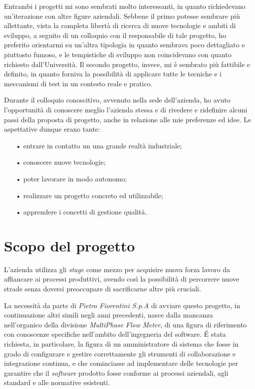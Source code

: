 Entrambi i progetti mi sono sembrati molto interessanti, in quanto richiedevano un'iterazione con altre figure aziendali. Sebbene il primo potesse sembrare più allettante, vista la completa libertà di ricerca di nuove tecnologie e ambiti di sviluppo, a seguito di un colloquio con il responsabile di tale progetto, ho preferito orientarmi su un'altra tipologia in quanto sembrava poco dettagliato e piuttosto fumoso, e le tempistiche di sviluppo non coincidevano con quanto richiesto dall'Università. Il secondo progetto, invece, mi è sembrato più fattibile e definito, in quanto forniva la possibilità di applicare tutte le tecniche e i meccanismi di test in un contesto reale e pratico.

Durante il colloquio conoscitivo, avvenuto nella sede dell'azienda, ho avuto l'opportunità di conoscere meglio l'azienda stessa e di rivedere e ridefinire alcuni passi della proposta di progetto, anche in relazione alle mie preferenze ed idee. Le aspettative dunque erano tante:
\begin{itemize}
\item[•] entrare in contatto un una grande realtà industriale;
\item[•] conoscere nuove tecnologie;
\item[•] poter lavorare in modo autonomo;
\item[•] realizzare un progetto concreto ed utilizzabile;
\item[•] apprendere i concetti di gestione qualità.
\end{itemize}


\section{Scopo del progetto}

L'azienda utilizza gli \textit{stage} come mezzo per acquisire nuova forza lavoro da affiancare ai processi produttivi, avendo così la possibilità di percorrere nuove strade senza doversi preoccupare di sacrificarne altre più cruciali. 

La necessità da parte di \textit{Pietro Fiorentini S.p.A} di avviare questo progetto, in continuazione altri simili negli anni precedenti, nasce dalla mancanza nell'organico della divisione \textit{MultiPhase Flow Meter}, di una figura di riferimento con conoscenze specifiche nell'ambito dell'ingegneria del software. É stata richiesta, in particolare, la figura di un amministratore di sistema che fosse in grado di configurare e gestire correttamente gli strumenti di collaborazione e integrazione continua, e che cominciasse ad implementare delle tecnologie per garantire che il \textit{software} prodotto fosse conforme ai processi aziendali, agli standard e alle normative esistenti. 

